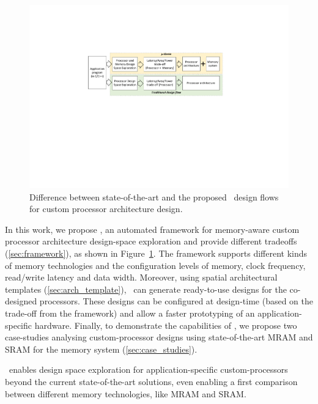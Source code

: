 \begin{figure}[ht]
    \centering
    \includegraphics[clip, trim=6cm 10.5cm 6.4cm 5.2cm, width=1.0\linewidth]{images/intro_figure.pdf} %
    \caption{Difference between state-of-the-art and the proposed \frameworkname~design flows for custom processor architecture design.}
    \label{fig:intro}
\end{figure}
In this work, we propose \frameworkname, an automated framework for memory-aware custom processor architecture design-space exploration and provide different tradeoffs (\ref{sec:framework}), as shown in Figure~\ref{fig:intro}. The framework supports different kinds of memory technologies and the configuration levels of memory, clock frequency, read/write latency and data width. Moreover, using spatial architectural templates (\ref{sec:arch_template}), \frameworkname~can generate ready-to-use designs for the co-designed processors. These designs can be configured at design-time (based on the trade-off from the framework) and allow a faster prototyping of an application-specific hardware. Finally, to demonstrate the capabilities of \frameworkname, we propose two case-studies analysing custom-processor designs using state-of-the-art MRAM and SRAM for the memory system (\ref{sec:case_studies}).
 
\frameworkname~enables design space exploration for application-specific custom-processors beyond the current state-of-the-art solutions, even enabling a first comparison between different memory technologies, like MRAM and SRAM.




